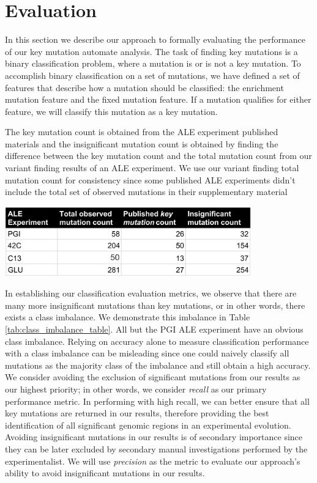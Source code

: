 \documentclass[12pt,final,masters,chapterheads]{ucsd}  %
\begin{document}
\section{Evaluation}
In this section we describe our approach to formally evaluating the performance of our key mutation automate analysis. The task of finding key mutations is a binary classification problem, where a mutation is or is not a key mutation. To accomplish binary classification on a set of mutations, we have defined a set of features that describe how a mutation should be classified: the enrichment mutation feature and the fixed mutation feature. If a mutation qualifies for either feature, we will classify this mutation as a key mutation.
\begin{table}[H]
  \caption[Published key mutation versus \textit{insignificant} mutation class imbalance.]{ The key mutation count is obtained from the ALE experiment published materials and the insignificant mutation count is obtained by finding the difference between the key mutation count and the total mutation count from our variant finding results of an ALE experiment. We use our variant finding total mutation count for consistency since some published ALE experiments didn't include the total set of observed mutations in their supplementary material}
  \centering
  \includegraphics[width=0.8\textwidth]{class_imbalance_table.png}
  \label{tab:class_imbalance_table}
\end{table}
In establishing our classification evaluation metrics, we observe that there are many more insignificant mutations than key mutations, or in other words, there exists a class imbalance. We demonstrate this imbalance in Table \ref{tab:class_imbalance_table}. All but the PGI ALE experiment have an obvious class imbalance. Relying on accuracy alone to measure classification performance with a class imbalance can be misleading since one could naively classify all mutations as the majority class of the imbalance and still obtain a high accuracy. We consider avoiding the exclusion of significant mutations from our results as our highest priority; in other words, we consider \textit{recall} as our primary performance metric. In performing with high recall, we can better ensure that all key mutations are returned in our results, therefore providing the best identification of all significant genomic regions in an experimental evolution. Avoiding insignificant mutations in our results is of secondary importance since they can be later excluded by secondary manual investigations performed by the experimentalist. We will use \textit{precision} as the metric to evaluate our approach's ability to avoid insignificant mutations in our results.
\end{document}
